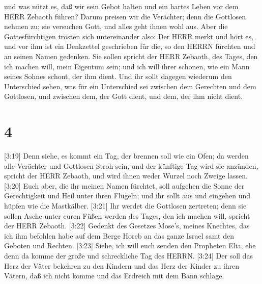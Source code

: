 und was nützt es, daß wir sein Gebot halten und ein hartes Leben vor dem
HERR Zebaoth führen?  Darum preisen wir die Verächter; denn
die Gottlosen nehmen zu; sie versuchen Gott, und alles geht ihnen wohl
aus.  Aber die Gottesfürchtigen trösten sich untereinander
also: Der HERR merkt und hört es, und vor ihm ist ein Denkzettel
geschrieben für die, so den HERRN fürchten und an seinen Namen gedenken.
 Sie sollen spricht der HERR Zebaoth, des Tages, den ich
machen will, mein Eigentum sein; und ich will ihrer schonen, wie ein
Mann seines Sohnes schont, der ihm dient.  Und ihr sollt
dagegen wiederum den Unterschied sehen, was für ein Unterschied sei
zwischen dem Gerechten und dem Gottlosen, und zwischen dem, der Gott
dient, und dem, der ihm nicht dient.

\hypertarget{section-3}{%
\section{4}\label{section-3}}

 {[}3:19{]} Denn siehe, es kommt ein Tag, der brennen soll
wie ein Ofen; da werden alle Verächter und Gottlosen Stroh sein, und der
künftige Tag wird sie anzünden, spricht der HERR Zebaoth, und wird ihnen
weder Wurzel noch Zweige lassen.  {[}3:20{]} Euch aber, die
ihr meinen Namen fürchtet, soll aufgehen die Sonne der Gerechtigkeit und
Heil unter ihren Flügeln; und ihr sollt aus und eingehen und hüpfen wie
die Mastkälber.  {[}3:21{]} Ihr werdet die Gottlosen
zertreten; denn sie sollen Asche unter euren Füßen werden des Tages, den
ich machen will, spricht der HERR Zebaoth.  {[}3:22{]}
Gedenkt des Gesetzes Mose's, meines Knechtes, das ich ihm befohlen habe
auf dem Berge Horeb an das ganze Israel samt den Geboten und Rechten.
 {[}3:23{]} Siehe, ich will euch senden den Propheten Elia,
ehe denn da komme der große und schreckliche Tag des HERRN. 
{[}3:24{]} Der soll das Herz der Väter bekehren zu den Kindern und das
Herz der Kinder zu ihren Vätern, daß ich nicht komme und das Erdreich
mit dem Bann schlage.
